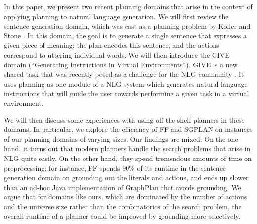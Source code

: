 

In this paper, we present two recent planning domains that arise in
the context of applying planning to natural language generation.  We
will first review the sentence generation domain, which was cast as a
planning problem by Koller and Stone \citeyear{KolSto07}.  In this
domain, the goal is to generate a single sentence that expresses a
given piece of meaning; the plan encodes this sentence, and the
actions correspond to uttering individual words.  We will then
introduce the GIVE domain (``Generating Instructions in Virtual
Environments'').  GIVE is a new shared task that was recently posed as
a challenge for the NLG community
\cite{alexander07:_shared_task_propos}.  It uses planning as one
module of a NLG system which generates natural-language instructions
that will guide the user towards performing a given task in a virtual
environment.

We will then discuss some experiences with using off-the-shelf
planners in these domains.  In particular, we explore the efficiency
of FF \cite{HoffmannNebel01} and SGPLAN
\cite{hsu06:_new_featur_in_sgplan_for} on instances of our planning
domains of varying sizes.  Our findings are mixed.  On the one hand,
it turns out that modern planners handle the search problems that
arise in NLG quite easily.  On the other hand, they spend tremendous
amounts of time on preprocessing; for instance, FF spends 90\% of its
runtime in the sentence generation domain on grounding out the
literals and actions, and ends up slower than an ad-hoc Java
implementation of GraphPlan that avoids grounding.  We argue that for
domains like ours, which are dominated by the number of actions and the
universe size rather than the combinatorics of the search problem, the
overall runtime of a planner could be improved by grounding more
selectively.







